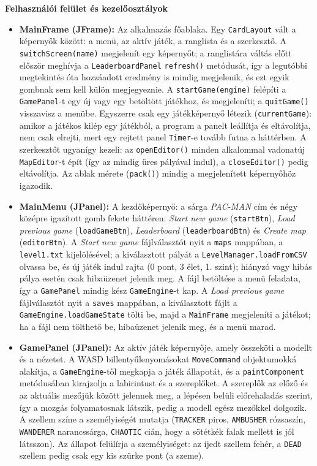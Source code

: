\documentclass[11pt, a4paper]{article}
\begin{document}
\vspace{0.3cm}
\textbf{Felhasználói felület és kezelőosztályok}
\begin{itemize}
    \item \textbf{MainFrame (JFrame):} Az alkalmazás főablaka. Egy \texttt{CardLayout} vált a képernyők között: a menü, az aktív játék, a ranglista és a szerkesztő. A \texttt{switchScreen(name)} megjelenít egy képernyőt; a ranglistára váltás előtt először meghívja a \texttt{LeaderboardPanel} \texttt{refresh()} metódusát, így a legutóbbi megtekintés óta hozzáadott eredmény is mindig megjelenik, és ezt egyik gombnak sem kell külön megjegyeznie. A \texttt{startGame(engine)} felépíti a \texttt{GamePanel}-t egy új vagy egy betöltött játékhoz, és megjeleníti; a \texttt{quitGame()} visszavisz a menübe. Egyszerre csak egy játékképernyő létezik (\texttt{currentGame}): amikor a játékos kilép egy játékból, a program a panelt leállítja és eltávolítja, nem csak elrejti, mert egy rejtett panel \texttt{Timer}-e tovább futna a háttérben. A szerkesztőt ugyanígy kezeli: az \texttt{openEditor()} minden alkalommal vadonatúj \texttt{MapEditor}-t épít (így az mindig üres pályával indul), a \texttt{closeEditor()} pedig eltávolítja. Az ablak mérete (\texttt{pack()}) mindig a megjelenített képernyőhöz igazodik.
    \item \textbf{MainMenu (JPanel):} A kezdőképernyő: a sárga \textit{PAC-MAN} cím és négy középre igazított gomb fekete háttéren: \textit{Start new game} (\texttt{startBtn}), \textit{Load previous game} (\texttt{loadGameBtn}), \textit{Leaderboard} (\texttt{leaderboardBtn}) és \textit{Create map} (\texttt{editorBtn}). A \textit{Start new game} fájlválasztót nyit a \texttt{maps} mappában, a \texttt{level1.txt} kijelölésével; a kiválasztott pályát a \texttt{LevelManager.loadFromCSV} olvassa be, és új játék indul rajta (0 pont, 3 élet, 1. szint); hiányzó vagy hibás pálya esetén csak hibaüzenet jelenik meg. A fájl betöltése a menü feladata, így a \texttt{GamePanel} mindig kész \texttt{GameEngine}-t kap. A \textit{Load previous game} fájlválasztót nyit a \texttt{saves} mappában, a kiválasztott fájlt a \texttt{GameEngine.loadGameState} tölti be, majd a \texttt{MainFrame} megjeleníti a játékot; ha a fájl nem tölthető be, hibaüzenet jelenik meg, és a menü marad.
    \item \textbf{GamePanel (JPanel):} Az aktív játék képernyője, amely összeköti a modellt és a nézetet. A WASD billentyűlenyomásokat \texttt{MoveCommand} objektumokká alakítja, a \texttt{GameEngine}-től megkapja a játék állapotát, és a \texttt{paintComponent} metódusában kirajzolja a labirintust és a szereplőket. A szereplők az előző és az aktuális mezőjük között jelennek meg, a lépésen belüli előrehaladás szerint, így a mozgás folyamatosnak látszik, pedig a modell egész mezőkkel dolgozik. A szellem színe a személyiségét mutatja (\texttt{TRACKER} piros, \texttt{AMBUSHER} rózsaszín, \texttt{WANDERER} narancssárga, \texttt{CHAOTIC} cián, hogy a sötétkék falak mellett is jól látsszon). Az állapot felülírja a személyiséget: az ijedt szellem fehér, a \texttt{DEAD} szellem pedig csak egy kis szürke pont (a szeme).

\end{itemize}
\end{document}
